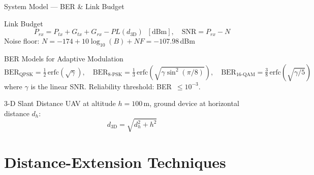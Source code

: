 \documentclass[aspectratio=169, 11pt]{beamer}
\begin{document}
\begin{frame}{System Model --- BER \& Link Budget}
\begin{block}{Link Budget}
\[
P_{rx} = P_{tx} + G_{tx} + G_{rx} - PL(d_{\text{3D}}) \;\;[\text{dBm}], \quad \text{SNR} = P_{rx} - N
\]
Noise floor: $N = -174 + 10\log_{10}(B) + NF = -107.98$\,dBm
\end{block}
\vspace{0.2cm}
\begin{block}{BER Models for Adaptive Modulation}
\[
\text{BER}_{\text{QPSK}} = \tfrac{1}{2}\,\text{erfc}(\sqrt{\gamma}), \quad
\text{BER}_{\text{8-PSK}} = \tfrac{1}{3}\,\text{erfc}\!\left(\sqrt{\gamma\sin^2(\pi/8)}\right), \quad
\text{BER}_{\text{16-QAM}} = \tfrac{3}{8}\,\text{erfc}\!\left(\sqrt{\gamma/5}\right)
\]
where $\gamma$ is the linear SNR. Reliability threshold: BER~$\leq 10^{-3}$.
\end{block}
\vspace{0.2cm}
\begin{exampleblock}{3-D Slant Distance}
UAV at altitude $h = 100$\,m, ground device at horizontal distance $d_h$:
\[
d_{\text{3D}} = \sqrt{d_h^2 + h^2}
\]
\end{exampleblock}
\end{frame}

\section{Distance-Extension Techniques}
\end{document}
